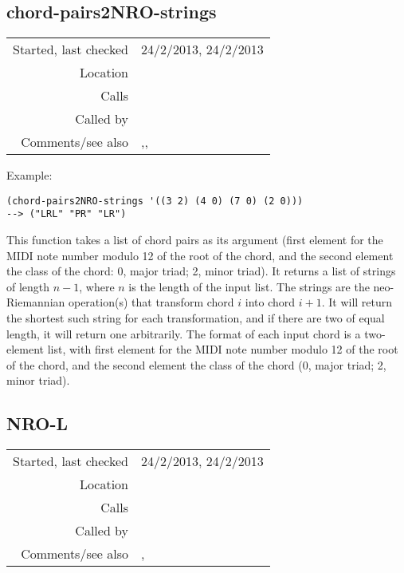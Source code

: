 \subsection*{chord-pairs2NRO-strings}\label{fun:chord-pairs2NRO-strings}

\vspace{0.3cm}
\begin{tabular}{r|p{8cm}}
Started, last checked & 24/2/2013, 24/2/2013 \\
Location & \nameref{sec:NRO} \\
Calls & \nameref{fun:chord-pairs2NRO-strings} \\
Called by & \\
Comments/see also & \nameref{fun:chord-pair2NRO-string},\newline \nameref{fun:NRO-string2chord-pairs},\newline \nameref{fun:NRO-strings2chord-pairs}
\end{tabular}

\vspace{0.5cm}
\noindent Example:
\begin{verbatim}
(chord-pairs2NRO-strings '((3 2) (4 0) (7 0) (2 0)))
--> ("LRL" "PR" "LR")
\end{verbatim}

\noindent This function takes a list of chord pairs as
its argument (first element for the MIDI note number
modulo 12 of the root of the chord, and the second
element the class of the chord: 0, major triad; 2,
minor triad). It returns a list of strings of length
$n - 1$, where $n$ is the length of the input list.
The strings are the neo-Riemannian operation(s)
that transform chord $i$ into chord $i + 1$. It will
return the shortest such string for each
transformation, and if there are two of equal length,
it will return one arbitrarily. The format of each
input chord is a two-element list, with first element
for the MIDI note number modulo 12 of the root of the
chord, and the second element the class of the chord
(0, major triad; 2, minor triad).


\subsection*{NRO-L}\label{fun:NRO-L}

\vspace{0.3cm}
\begin{tabular}{r|p{8cm}}
Started, last checked & 24/2/2013, 24/2/2013 \\
Location & \nameref{sec:NRO} \\
Calls & \\
Called by & \nameref{fun:NRO-string2chord-pairs} \\
Comments/see also & \nameref{fun:NRO-P}, \nameref{fun:NRO-R}
\end{tabular}

